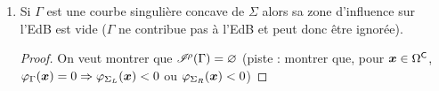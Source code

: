 \begin{enumerate}
\begin{proof}
		Or, si $\bx \in \influEdB{\Gamma}{\rho}$ alors\footnote{car $\forall \bx \in \EdB{\Sigma}{\rho}, \implicitEdB{\Gamma}(\bx) \geq 0$ et $\forall \bx \in \sphere[\Gamma][\rho], \implicitEdB{\Gamma}(\bx) \leq 0$.} $\implicitEdB{\Gamma}(\bx) = 0$ et donc $\implicitEdB{\Sigma_L}(\bx) \leq 0$ et $\implicitEdB{\Sigma_R}(\bx) \leq 0$.\par
		Mais si $\implicitEdB{\Sigma_L} < 0$ ou $\implicitEdB{\Sigma_R} < 0$ alors\footnote{car $\forall H \subseteq \Sigma, \forall \bx \in \EdB{\Sigma}{\rho}, \implicitEdB{H}(\bx) \geq 0$.} $\bx \notin \EdB{\Sigma}{\rho}$ et donc $\bx \notin \influEdB{\Gamma}{\rho}$.\par
		Donc si $\bx \in \influEdB{\Gamma}{\rho}$ alors $\implicitEdB{\Sigma_L}(\bx) = 0$ et $\implicitEdB{\Sigma_R}(\bx) = 0$.
	\end{proof}
	
	\item Si $\Gamma$ est une courbe singulière concave de $\Sigma$ alors sa zone d'influence sur l'EdB est vide (\ie $\Gamma$ ne contribue pas à l'EdB et peut donc être ignorée).
	\begin{proof}
		On veut montrer que $\mathscr{I}^{\!\rho}({\Gamma}) = \varnothing$ (piste : montrer que, pour $\boldsymbol{x} \in \Omega^\mathsf{C}$, $\varphi_{\Gamma}(\boldsymbol{x}) = 0 \Rightarrow \varphi_{\Sigma_L}(\boldsymbol{x}) < 0$ ou $\varphi_{\Sigma_R}(\boldsymbol{x}) < 0$)
	\end{proof}
	

\end{enumerate}
